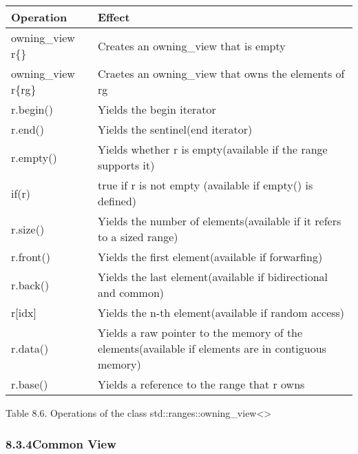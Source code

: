 \begin{longtable}[c]{|l|l|}
	\hline
	\textbf{Operation}   & \textbf{Effect}                                                \\ \hline
	\endfirsthead
	\endhead
	owning\_view r\{\}   & Creates an owning\_view that is empty                          \\ \hline
	owning\_view r\{rg\} & Craetes an owning\_view that owns the elements of rg           \\ \hline
	r.begin()            & Yields the begin iterator                                      \\ \hline
	r.end()              & Yields the sentinel(end iterator)                              \\ \hline
	r.empty()            & Yields whether r is empty(available if the range supports it)  \\ \hline
	if(r)                & true if r is not empty (available if empty() is defined)       \\ \hline
	r.size() & Yields the number of elements(available if it refers to a sized range)                             \\ \hline
	r.front()            & Yields the first element(available if forwarfing)              \\ \hline
	r.back()             & Yields the last element(available if bidirectional and common) \\ \hline
	r{[}idx{]}           & Yields the n-th element(available if random access)            \\ \hline
	r.data() & Yields a raw pointer to the memory of the elements(available if elements are in contiguous memory) \\ \hline
	r.base()             & Yields a reference to the range that r owns                    \\ \hline
\end{longtable}

\begin{center}
Table 8.6. Operations of the class std::ranges::owning\_view<>
\end{center}


\subsubsection*{ 8.3.4\hspace{0.2cm}Common View}

















